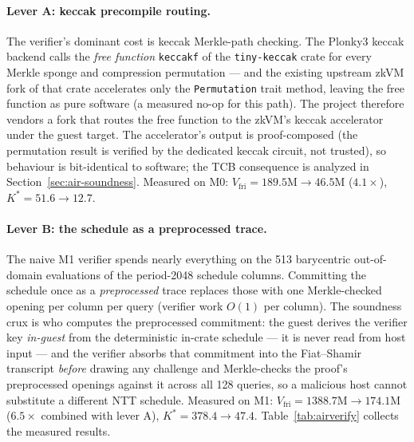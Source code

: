 \documentclass[11pt]{article}
\newcommand{\code}[1]{\texttt{#1}}
\theoremstyle{plain}
\theoremstyle{definition}
\theoremstyle{remark}
\begin{document}
\paragraph{Lever A: keccak precompile routing.} The verifier's dominant
cost is keccak Merkle-path checking. The Plonky3 keccak backend calls the
\emph{free function} \code{keccakf} of the \code{tiny-keccak} crate for
every Merkle sponge and compression permutation --- and the existing
upstream zkVM fork of that crate accelerates only the \code{Permutation}
trait method, leaving the free function as pure software (a measured no-op
for this path). The project therefore vendors a fork that routes the free
function to the zkVM's keccak accelerator under the guest target. The
accelerator's output is proof-composed (the permutation result is verified
by the dedicated keccak circuit, not trusted), so behaviour is bit-identical
to software; the TCB consequence is analyzed in
Section~\ref{sec:air-soundness}. Measured on M0:
$V_{\mathrm{fri}} = 189.5\mathrm{M} \to 46.5\mathrm{M}$ ($4.1\times$),
$K^\ast = 51.6 \to 12.7$.

\paragraph{Lever B: the schedule as a preprocessed trace.} The naive M1
verifier spends nearly everything on the 513 barycentric out-of-domain
evaluations of the period-2048 schedule columns. Committing the schedule
once as a \emph{preprocessed} trace replaces those with one Merkle-checked
opening per column per query (verifier work $O(1)$ per column). The
soundness crux is who computes the preprocessed commitment: the guest
derives the verifier key \emph{in-guest} from the deterministic in-crate
schedule --- it is never read from host input --- and the verifier absorbs
that commitment into the Fiat--Shamir transcript \emph{before} drawing any
challenge and Merkle-checks the proof's preprocessed openings against it
across all 128 queries, so a malicious host cannot substitute a different
NTT schedule. Measured on M1: $V_{\mathrm{fri}} = 1388.7\mathrm{M} \to
174.1\mathrm{M}$ ($6.5\times$ combined with lever A),
$K^\ast = 378.4 \to 47.4$. Table~\ref{tab:airverify} collects the measured
results.
\end{document}
